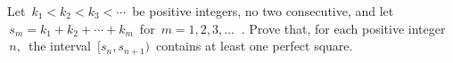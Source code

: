 Let $\, k_1 < k_2 < k_3 < \cdots \,$ be positive integers, no two consecutive, and let $\, s_m = k_1 + k_2 + \cdots + k_m \,$ for $\, m = 1,2,3, \ldots \; \;$.  Prove that, for each positive integer $\, n, \,$ the interval $\, [s_n, s_{n+1}) \,$ contains at least one perfect square.
